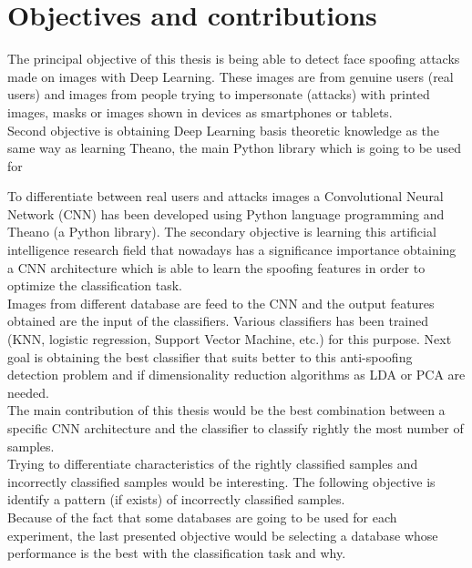 \section{Objectives and contributions}
The principal objective of this thesis is being able to detect face spoofing attacks made on images with Deep Learning. These images are from genuine users (real users) and images from people trying to impersonate (attacks) with printed images, masks or images shown in devices as smartphones or tablets.\\

Second objective is obtaining Deep Learning basis theoretic knowledge as the same way as learning Theano, the main Python library which is going to be used for 

To differentiate between real users and attacks images a Convolutional Neural Network (CNN) has been developed using Python language programming and Theano (a Python library). The secondary objective is learning this artificial intelligence research field that nowadays has a significance importance obtaining a CNN architecture which is able to learn the spoofing features in order to optimize the classification task.\\

Images from different database are feed to the CNN and the output features obtained are the input of the classifiers. Various classifiers has been trained (KNN, logistic regression, Support Vector Machine, etc.) for this purpose. Next goal is obtaining the best classifier that suits better to this anti-spoofing detection problem and if dimensionality reduction algorithms as LDA or PCA are needed.\\

The main contribution of this thesis would be the best combination between a specific CNN architecture and the classifier to classify rightly the most number of samples.\\

Trying to differentiate characteristics of the rightly classified samples and incorrectly classified samples would be interesting. The following objective is identify a pattern (if exists) of incorrectly classified samples.\\

Because of the fact that some databases are going to be used for each experiment, the last presented objective would be  selecting a database whose performance is the best with the classification task and why.\\

